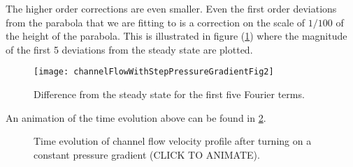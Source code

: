 The higher order corrections are even smaller.  Even the first order deviations from the parabola that we are fitting to is a correction on the scale of $1/100$ of the height of the parabola.  This is illustrated in figure (\ref{fig:channelFlowWithStepPressureGradient:channelFlowWithStepPressureGradientFig2}) where the magnitude of the first 5 deviations from the steady state are plotted.

\begin{figure}[htp]
   \centering
   \texttt{[image: channelFlowWithStepPressureGradientFig2]}
   \caption{Difference from the steady state for the first five Fourier terms.}
   \label{fig:channelFlowWithStepPressureGradient:channelFlowWithStepPressureGradientFig2}
\end{figure}

An animation of the time evolution above can be found in \ref{fig:channelFlowWithStepPressureGradient:channelFlowWithStepPressureGradientAnimation1}.

\begin{figure}[htp]
   \centering
   \caption{Time evolution of channel flow velocity profile after turning on a constant pressure gradient (CLICK TO ANIMATE).}
   \label{fig:channelFlowWithStepPressureGradient:channelFlowWithStepPressureGradientAnimation1}
\end{figure}


\EndArticle
